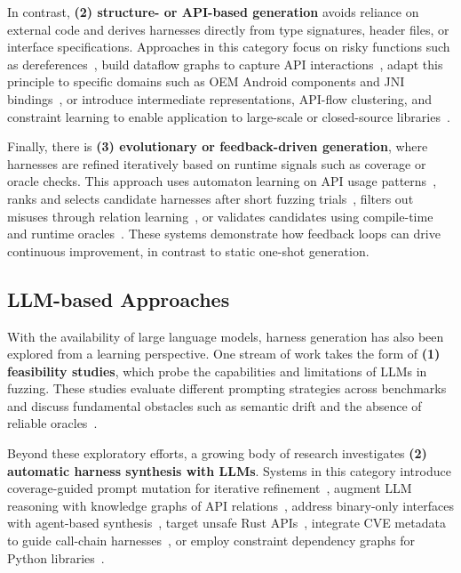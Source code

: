 \documentclass[sigconf,review,anonymous]{acmart}
\begin{document}
In contrast, \textbf{(2) structure- or API-based generation} avoids reliance on external code and derives harnesses directly from type signatures, header files, or interface specifications. Approaches in this category focus on risky functions such as dereferences~\cite{DBLP:conf/icse:ZhangLMZ021:IntelliGen}, build dataflow graphs to capture API interactions~\cite{DBLP:conf/icse/GreenA22:GraphFuzz}, adapt this principle to specific domains such as OEM Android components and JNI bindings~\cite{DBLP:conf/ccs/ChenXLWC23:Hopper, DBLP:conf/uss/IspoglouAMP20:FuzzGen, DBLP:conf/issta/XiongDCQWSZ24:Atlas}, or introduce intermediate representations, API-flow clustering, and constraint learning to enable application to large-scale or closed-source libraries~\cite{DBLP:journals/pacmse/ToffaliniBTP25:LibErator, DBLP:conf/icse/ShermanN25:OGHarn, DBLP:conf/ndss/0007ZLSZLQ25:NEXZZER}.

Finally, there is \textbf{(3) evolutionary or feedback-driven generation}, where harnesses are refined iteratively based on runtime signals such as coverage or oracle checks. This approach uses automaton learning on API usage patterns~\cite{DBLP:conf/uss/ZhangLZZZZXLL0H23:Rubick}, ranks and selects candidate harnesses after short fuzzing trials~\cite{DBLP:journals/pacmse/ToffaliniBTP25:LibErator}, filters out misuses through relation learning~\cite{DBLP:conf/ndss/0007ZLSZLQ25:NEXZZER}, or validates candidates using compile-time and runtime oracles~\cite{DBLP:conf/icse/ShermanN25:OGHarn}. These systems demonstrate how feedback loops can drive continuous improvement, in contrast to static one-shot generation.

\subsection{LLM-based Approaches}
\label{subsec:llm-approaches}


With the availability of large language models, harness generation has also been explored from a learning perspective. One stream of work takes the form of \textbf{(1) feasibility studies}, which probe the capabilities and limitations of LLMs in fuzzing. These studies evaluate different prompting strategies across benchmarks~\cite{DBLP:conf/issta/ZhangZBLMXLSL24:HowEffectiveAreThey} and discuss fundamental obstacles such as semantic drift and the absence of reliable oracles~\cite{DBLP:conf/sigsoft/Jiang0MCZSWFWLZ24:WhenFuzzingMeetsLLMs}.

Beyond these exploratory efforts, a growing body of research investigates \textbf{(2) automatic harness synthesis with LLMs}. Systems in this category introduce coverage-guided prompt mutation for iterative refinement~\cite{DBLP:conf/ccs/LyuXCC24:PromptFuzz}, augment LLM reasoning with knowledge graphs of API relations~\cite{DBLP:conf/icse/XuMZZCHLW25:CKGFuzzer}, address binary-only interfaces with agent-based synthesis~\cite{DBLP:journals/corr/abs-2507-15058:LibLMFuzz}, target unsafe Rust APIs~\cite{DBLP:journals/corr/abs-2506-15648:deepSURF}, integrate CVE metadata to guide call-chain harnesses~\cite{DBLP:journals/corr/abs-2505-03425:HGFuzzer}, or employ constraint dependency graphs for Python libraries~\cite{DBLP:journals/cybersec/LiuLZZLL25:LLM4TDG}.
\end{document}
